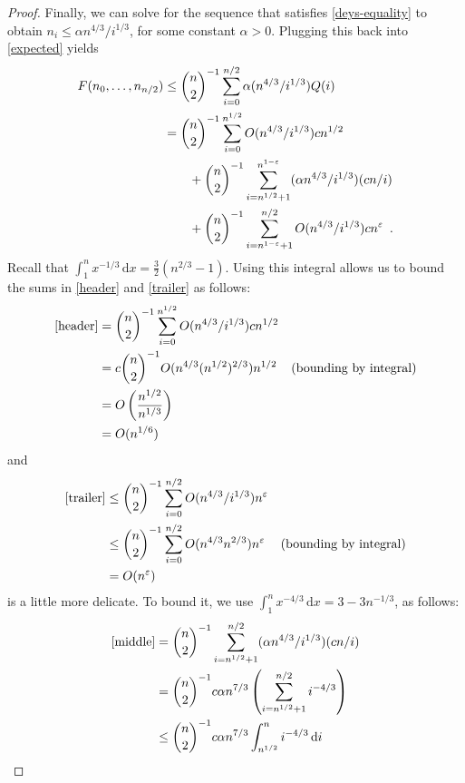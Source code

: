 \documentclass{patmorin}
\newcommand{\eps}{\varepsilon}
\begin{document}
\begin{proof}
  Finally, we can solve for the sequence that satisfies
  \eqref{deys-equality} to obtain $n_i \le \alpha n^{4/3}/i^{1/3}$, for some
  constant $\alpha>0$.  Plugging this back into \eqref{expected} yields
  \begin{align}
     F(n_0,\ldots,n_{n/2}) 
      & \le \binom{n}{2}^{-1}\sum_{i=0}^{n/2} \alpha (n^{4/3}/i^{1/3})Q(i) \notag \\
      & = \binom{n}{2}^{-1}\sum_{i=0}^{n^{1/2}} O(n^{4/3}/i^{1/3})cn^{1/2}  \eqlabel{header}\\
      & \qquad {} + \binom{n}{2}^{-1}\sum_{i=n^{1/2}+1}^{n^{1-\eps}} (\alpha n^{4/3}/i^{1/3})(cn/i)  \eqlabel{middle} \\
      & \qquad {} + \binom{n}{2}^{-1}\sum_{i=n^{1-\eps}+1}^{n/2} O(n^{4/3}/i^{1/3})cn^{\eps} \eqlabel{trailer} \enspace .
  \end{align}
  Recall that $\int_1^n x^{-1/3}\,\mathrm{d}x = \frac{3}{2}(n^{2/3}-1)$.
  Using this integral allows us to bound the sums in \eqref{header}
  and \eqref{trailer} as follows:
  \begin{align*}
    \eqref{header} & = \binom{n}{2}^{-1}\sum_{i=0}^{n^{1/2}} O(n^{4/3}/i^{1/3})cn^{1/2} \\
        & = c\binom{n}{2}^{-1}O(n^{4/3}(n^{1/2})^{2/3})n^{1/2}
           & \text{(bounding by integral)}  \\
        & = O\left(\frac{n^{1/2}}{n^{1/3}}\right) \\
        & = O(n^{1/6})
  \end{align*}
  and 
  \begin{align*}
    \eqref{trailer} 
      & \le \binom{n}{2}^{-1}\sum_{i=0}^{n/2} O(n^{4/3}/i^{1/3})n^{\eps} \\
      & \le \binom{n}{2}^{-1}\sum_{i=0}^{n/2} O(n^{4/3}n^{2/3})n^{\eps} 
                & \text{(bounding by integral)} \\
        & = O(n^{\eps})
  \end{align*}
   is a little more delicate.  To bound it, we
  use $\int_1^n x^{-4/3}\,\mathrm{d}x = 3-3n^{-1/3}$, as follows:
  \begin{align*}
    \eqref{middle} 
      & = \binom{n}{2}^{-1}
       \sum_{i=n^{1/2}+1}^{n/2} (\alpha n^{4/3}/i^{1/3})(cn/i) \\
      & = \binom{n}{2}^{-1}
       c\alpha n^{7/3}\left(\sum_{i=n^{1/2}+1}^{n/2} i^{-4/3} \right) \\
      & \le \binom{n}{2}^{-1}
       c\alpha n^{7/3}\int_{n^{1/2}}^{n} i^{-4/3}\,\mathrm{d}i \\

\end{align*}
\end{proof}
\end{document}
